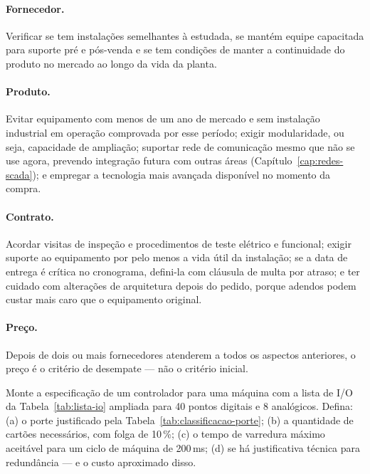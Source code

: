 \paragraph{Fornecedor.} Verificar se tem instalações semelhantes à estudada, se mantém equipe
capacitada para suporte pré e pós-venda e se tem condições de manter a continuidade do produto no
mercado ao longo da vida da planta.

\paragraph{Produto.} Evitar equipamento com menos de um ano de mercado e sem instalação industrial em
operação comprovada por esse período; exigir modularidade, ou seja, capacidade de ampliação; suportar
rede de comunicação mesmo que não se use agora, prevendo integração futura com outras áreas
(Capítulo~\ref{cap:redes-scada}); e empregar a tecnologia mais avançada disponível no momento da
compra.

\paragraph{Contrato.} Acordar visitas de inspeção e procedimentos de teste elétrico e funcional;
exigir suporte ao equipamento por pelo menos a vida útil da instalação; se a data de entrega é crítica
no cronograma, defini-la com cláusula de multa por atraso; e ter cuidado com alterações de
arquitetura depois do pedido, porque adendos podem custar mais caro que o equipamento original.

\paragraph{Preço.} Depois de dois ou mais fornecedores atenderem a todos os aspectos anteriores, o
preço é o critério de desempate --- não o critério inicial.

\begin{pratica}
Monte a especificação de um controlador para uma máquina com a lista de I/O da
Tabela~\ref{tab:lista-io} ampliada para 40 pontos digitais e 8 analógicos. Defina:
(a) o porte justificado pela Tabela~\ref{tab:classificacao-porte};
(b) a quantidade de cartões necessários, com folga de 10\,\%;
(c) o tempo de varredura máximo aceitável para um ciclo de máquina de 200\,ms;
(d) se há justificativa técnica para redundância --- e o custo aproximado disso.
\end{pratica}

